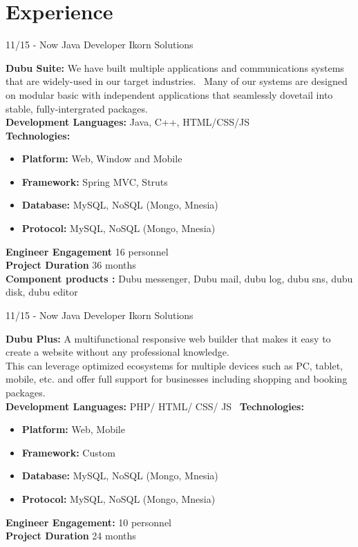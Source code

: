 \documentclass[]{friggeri-cv}
\begin{document}
\section{Experience}
\begin{entrylist}
  \entry
    {11/15 - Now}
    {Java Developer}
    {Ikorn Solutions}
   {\textbf{ Dubu Suite:} We have built multiple applications and communications systems that are widely-used in our target industries.~
	 Many of our systems are designed on modular basic with independent applications that seamlessly dovetail into stable, fully-intergrated packages.\\

	 \textbf{Development Languages:} Java, C++, HTML/CSS/JS\\
	 \textbf{Technologies:}~
			\begin{itemize}
				\item \textbf{Platform:} Web, Window and Mobile
				\item \textbf{Framework:} Spring MVC, Struts
				\item \textbf{Database:} MySQL, NoSQL (Mongo, Mnesia)
				\item \textbf{Protocol:} MySQL, NoSQL (Mongo, Mnesia)
			\end{itemize}
		 \textbf{Engineer Engagement} 16 personnel\\
		 \textbf{Project Duration} 36 months\\
		 \textbf{Component products :} Dubu messenger, Dubu mail, dubu log, dubu sns, dubu disk, dubu editor\\
}
\end{entrylist}
\begin{entrylist}
\entry
    {11/15 - Now}
    {Java Developer}
    {Ikorn Solutions}
	{\textbf{ Dubu Plus: } A multifunctional responsive web builder that makes it easy to create a website without any professional knowledge.
	\\ This can leverage optimized ecosystems for multiple devices such as PC, tablet, mobile, etc. and offer full support for businesses including shopping and booking packages.\\

		 \textbf{Development Languages:} PHP/ HTML/ CSS/ JS~
		 \textbf{Technologies:}~
			\begin{itemize}
				\item \textbf{Platform:} Web,  Mobile
				\item \textbf{Framework:} Custom
				\item \textbf{Database:} MySQL, NoSQL (Mongo, Mnesia)
				\item \textbf{Protocol:} MySQL, NoSQL (Mongo, Mnesia)
			\end{itemize}
		 \textbf{Engineer Engagement:} 10 personnel\\
		 \textbf{Project Duration} 24  months\\
	}
\end{entrylist}
\end{document}
